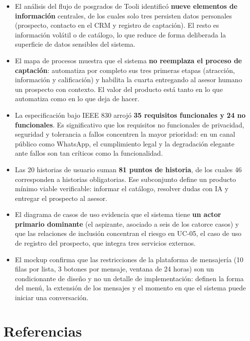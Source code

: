 \documentclass[12pt,a4paper]{report}
\begin{document}
\begin{itemize}[itemsep=4pt]
    \item El análisis del flujo de posgrados de Tooli identificó \textbf{nueve elementos de
    información} centrales, de los cuales solo tres persisten datos personales (prospecto, contacto
    en el CRM y registro de captación). El resto es información volátil o de catálogo, lo que reduce
    de forma deliberada la superficie de datos sensibles del sistema.
    \item El mapa de procesos muestra que el sistema \textbf{no reemplaza el proceso de captación}:
    automatiza por completo sus tres primeras etapas (atracción, información y calificación) y
    habilita la cuarta entregando al asesor humano un prospecto con contexto. El valor del producto
    está tanto en lo que automatiza como en lo que deja de hacer.
    \item La especificación bajo IEEE 830 arrojó \textbf{35 requisitos funcionales y 24 no
    funcionales}. Es significativo que los requisitos no funcionales de privacidad, seguridad y
    tolerancia a fallos concentren la mayor prioridad: en un canal público como WhatsApp, el
    cumplimiento legal y la degradación elegante ante fallos son tan críticos como la funcionalidad.
    \item Las 20 historias de usuario suman \textbf{81 puntos de historia}, de los cuales 46
    corresponden a historias obligatorias. Ese subconjunto define un producto mínimo viable
    verificable: informar el catálogo, resolver dudas con IA y entregar el prospecto al asesor.
    \item El diagrama de casos de uso evidencia que el sistema tiene \textbf{un actor primario
    dominante} (el aspirante, asociado a seis de los catorce casos) y que las relaciones de
    inclusión concentran el riesgo en UC-05, el caso de uso de registro del prospecto, que integra
    tres servicios externos.
    \item El mockup confirma que las restricciones de la plataforma de mensajería (10 filas por
    lista, 3 botones por mensaje, ventana de 24 horas) son un condicionante de diseño y no un detalle
    de implementación: definen la forma del menú, la extensión de los mensajes y el momento en que el
    sistema puede iniciar una conversación.
\end{itemize}

\section{Referencias}
\end{document}
